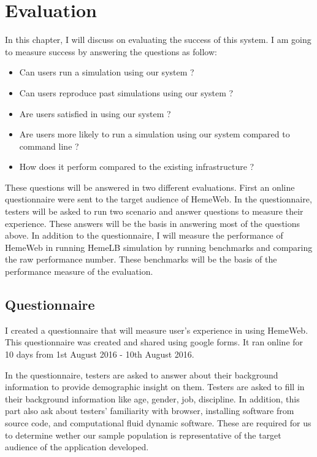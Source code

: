 

\chapter[Evaluation]{Evaluation}
In this chapter, I will discuss on evaluating the success of this system. I am going to measure success by answering the questions as follow:

\begin{itemize}
    \item Can users run a simulation using our system ?
    \item Can users reproduce past simulations using our system ?
    \item Are users satisfied in using our system ?
    \item Are users more likely to run a simulation using our system compared to command line ?
    \item How does it perform compared to the existing infrastructure ?
\end{itemize}


These questions will be answered in two different evaluations. First an online questionnaire were sent to the target audience of HemeWeb. In the questionnaire, testers will be asked to run two scenario and answer questions to measure their experience. These answers will be the basis in answering most of the questions above. In addition to the questionnaire, I will measure the performance of HemeWeb in running HemeLB simulation by running benchmarks and comparing the raw performance number. These benchmarks will be the basis of the performance measure of the evaluation.

\section{Questionnaire}

I created a questionnaire that will measure user's experience in using HemeWeb. This questionnaire was created and shared using google forms. It ran online for 10 days from 1st August 2016 - 10th August 2016.


In the questionnaire, testers are asked to answer about their background information to provide demographic insight on them. Testers are asked to fill in their background information like age, gender, job, discipline. In addition, this part also ask about testers' familiarity with browser, installing software from source code, and computational fluid dynamic software. These are required for us to determine wether our sample population is representative of the target audience of the application developed.


